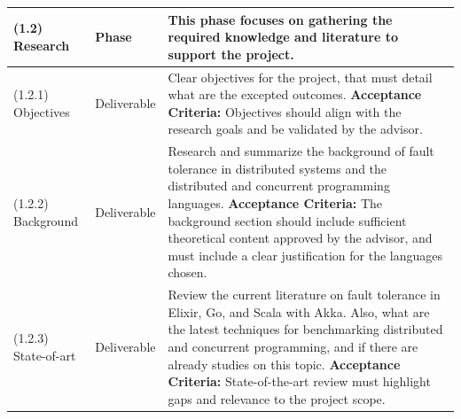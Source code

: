 \begin{longtable}{|p{3cm}|p{2.5cm}|p{8cm}|}
      (1.2) Research                 & Phase                 & This phase focuses on gathering the required knowledge and literature to support the project.                                                                                                                                                                                                                                                             \\ \hline
      (1.2.1) Objectives             & Deliverable           & Clear objectives for the project, that must detail what are the excepted outcomes. \newline \textbf{Acceptance Criteria:} Objectives should align with the research goals and be validated by the advisor.                                                                                                                                                \\ \hline
      (1.2.2) Background             & Deliverable           & Research and summarize the background of fault tolerance in distributed systems and the distributed and concurrent programming languages.  \newline \textbf{Acceptance Criteria:} The background section should include sufficient theoretical content approved by the advisor, and must include a clear justification for the languages chosen.          \\ \hline
      (1.2.3) State-of-art           & Deliverable           & Review the current literature on fault tolerance in Elixir, Go, and Scala with Akka. Also, what are the latest techniques for benchmarking distributed and concurrent programming, and if there are already studies on this topic. \newline \textbf{Acceptance Criteria:} State-of-the-art review must highlight gaps and relevance to the project scope. \\ \hline
      \hline %


\end{longtable}
